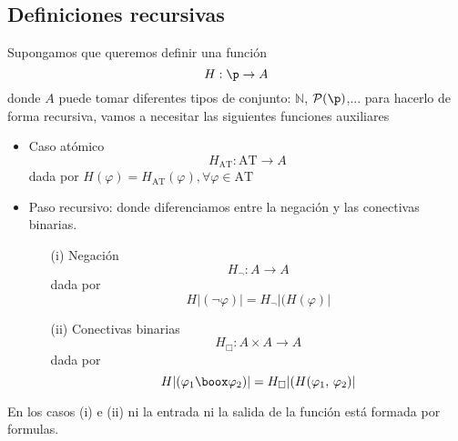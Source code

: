 \subsection{Definiciones recursivas}
Supongamos que queremos definir una función 
\[ H: \p \rightarrow A \]
donde $A$ puede tomar diferentes tipos de conjunto: $\mathbb{N}$, $\mathcal{P}(\p)$,... para hacerlo de forma recursiva, vamos a necesitar las siguientes funciones auxiliares
\begin{itemize}
	\item Caso atómico
	\[ H_{\mbox{AT}}: \mbox{AT} \rightarrow A \]
dada por $H(\varphi)=H_{\mbox{AT}}(\varphi), \forall \varphi \in \mbox{AT}$
	\item Paso recursivo: donde diferenciamos entre la negación y las conectivas binarias. 
	\begin{itemize}
		\item[(i)] Negación 
		\[ H_{\lnot}: A \rightarrow A \]
		dada por 
	\[ H \vert (\lnot \varphi) \vert = H_{\lnot}\vert (H(\varphi) \vert \]
		\item[(ii)] Conectivas binarias 
		\[ H_{\Box}: A \times A \rightarrow A \]
		dada por 
	\[ H \vert (\varphi_1 \boox \varphi_2) \vert = H_{\Box}\vert (H(\varphi_1, \, \varphi_2) \vert \]
	\end{itemize}
\end{itemize} 
En los casos (i) e (ii) ni la entrada ni la salida de la función está formada por formulas. 
